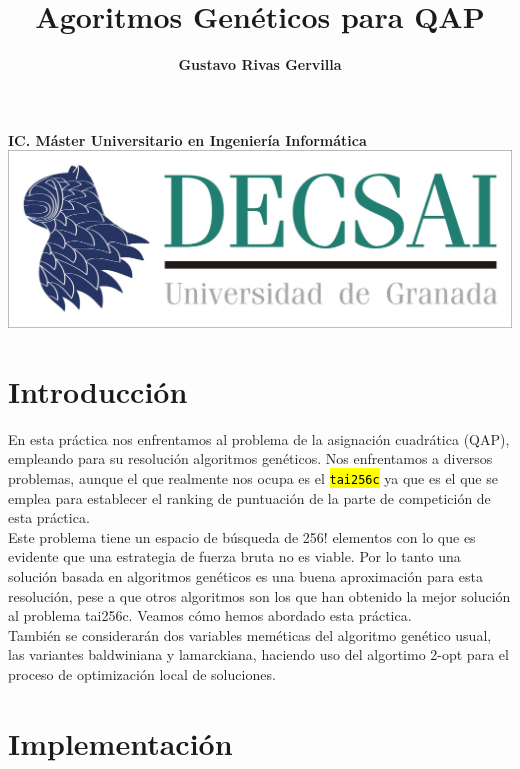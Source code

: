 \documentclass[10pt,a4paper]{article}
\author{\textbf{Gustavo Rivas Gervilla}}
\title{\textcolor{deepblue}{\textbf{Agoritmos Genéticos para QAP}}}
\date{}
\newcommand{\code}[1]{\sethlcolor{light-gray}\hl{\texttt{#1}}} %
\begin{document}
\maketitle
\begin{center}
\textbf{IC. Máster Universitario en Ingeniería Informática}
\newline
\newline
\newline
\includegraphics[scale=0.5]{img/decsai}
\end{center}

\newpage
\tableofcontents
\newpage

\def\layersep{2.5cm}

\section{Introducción}

En esta práctica nos enfrentamos al problema de la asignación cuadrática (QAP), empleando para su resolución algoritmos genéticos. Nos enfrentamos a diversos problemas, aunque el que realmente nos ocupa es el \code{tai256c} ya que es el que se emplea para establecer el ranking de puntuación de la parte de competición de esta práctica.\\

Este problema tiene un espacio de búsqueda de 256! elementos con lo que es evidente que una estrategia de fuerza bruta no es viable. Por lo tanto una solución basada en algoritmos genéticos es una buena aproximación para esta resolución, pese a que otros algoritmos son los que han obtenido la mejor solución al problema tai256c. Veamos cómo hemos abordado esta práctica.\\

También se considerarán dos variables meméticas del algoritmo genético usual, las variantes baldwiniana y lamarckiana, haciendo uso del algortimo 2-opt para el proceso de optimización local de soluciones.

\section{Implementación}
\end{document}
